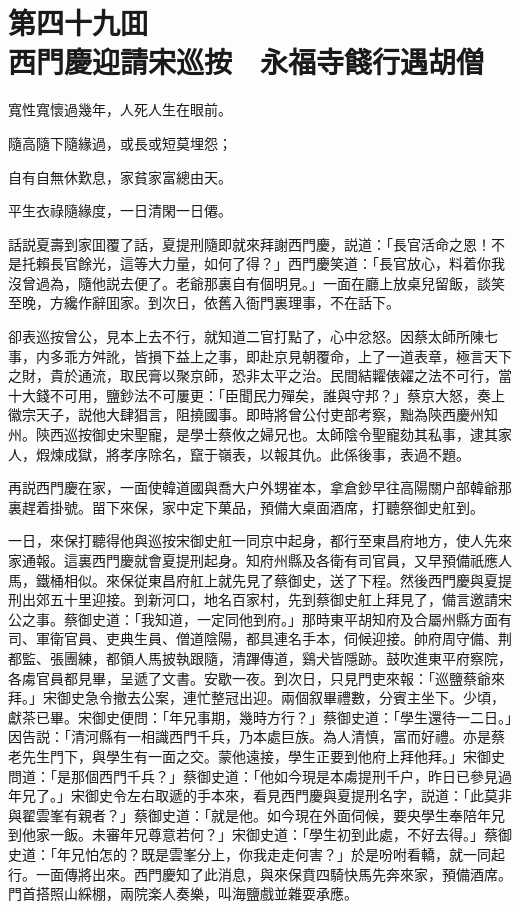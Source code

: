 
\chapter*{第四十九囬　\\西門慶迎請宋巡按　永福寺餞行遇胡僧}
\thispagestyle{empty}

\begin{myquote}
寬性寬懷過幾年，人死人生在眼前。

隨高隨下隨緣過，或長或短莫埋怨；

自有自無休歎息，家貧家富總由天。

平生衣祿隨緣度，一日清閑一日僊。
\end{myquote}

話説夏壽到家囬覆了話，夏提刑隨即就來拜謝西門慶，説道：「長官活命之恩！不是托賴長官餘光，這等大力量，如何了得？」西門慶笑道：「長官放心，料着你我沒曾過為，隨他説去便了。老爺那裏自有個明見。」一面在廳上放桌兒留飯，談笑至晚，方纔作辭囬家。到次日，依舊入衙門裏理事，不在話下。

卻表巡按曾公，見本上去不行，就知道二官打點了，心中忿怒。因蔡太師所陳七事，内多乖方舛訛，皆損下益上之事，即赴京見朝覆命，上了一道表章，極言天下之財，貴於通流，取民膏以聚京師，恐非太平之治。民間結糶俵糴之法不可行，當十大錢不可用，鹽鈔法不可屢更：「臣聞民力殫矣，誰與守邦？」蔡京大怒，奏上徽宗天子，説他大肆猖言，阻撓國事。即時將曾公付吏部考察，黜為陝西慶州知州。陝西巡按御史宋聖寵，是學士蔡攸之婦兄也。太師陰令聖寵劾其私事，逮其家人，煆煉成獄，將孝序除名，竄于嶺表，以報其仇。此係後事，表過不題。

再説西門慶在家，一面使韓道國與喬大户外甥崔本，拿倉鈔早往高陽關户部韓爺那裏趕着掛號。㽞下來保，家中定下菓品，預備大桌面酒席，打聽祭御史舡到。

一日，來保打聽得他與巡按宋御史舡一同京中起身，都行至東昌府地方，使人先來家通報。這裏西門慶就會夏提刑起身。知府州縣及各衛有司官員，又早預備祇應人馬，鐵桶相似。來保従東昌府舡上就先見了蔡御史，送了下程。然後西門慶與夏提刑出郊五十里迎接。到新河口，地名百家村，先到蔡御史舡上拜見了，備言邀請宋公之事。蔡御史道：「我知道，一定同他到府。」那時東平胡知府及合屬州縣方面有司、軍衛官員、吏典生員、僧道陰陽，都具連名手本，伺候迎接。帥府周守備、荆都監、張團練，都領人馬披執跟隨，清蹕傳道，鷄犬皆隱跡。鼓吹進東平府察院，各䖏官員都見畢，呈遞了文書。安歇一夜。到次日，只見門吏來報：「巡鹽蔡爺來拜。」宋御史急令撤去公案，連忙整冠出迎。兩個叙畢禮數，分賓主坐下。少頃，獻茶已畢。宋御史便問：「年兄事期，幾時方行？」蔡御史道：「學生還待一二日。」因告説：「清河縣有一相識西門千兵，乃本處巨族。為人清慎，富而好禮。亦是蔡老先生門下，與學生有一面之交。蒙他遠接，學生正要到他府上拜他拜。」宋御史問道：「是那個西門千兵？」蔡御史道：「他如今現是本䖏提刑千户，昨日已參見過年兄了。」宋御史令左右取遞的手本來，看見西門慶與夏提刑名字，説道：「此莫非與翟雲峯有親者？」蔡御史道：「就是他。如今現在外面伺候，要央學生奉陪年兄到他家一飯。未審年兄尊意若何？」宋御史道：「學生初到此處，不好去得。」蔡御史道：「年兄怕怎的？既是雲峯分上，你我走走何害？」於是吩咐看轎，就一同起行。一面傳將出來。西門慶知了此消息，與來保賁四騎快馬先奔來家，預備酒席。門首搭照山綵棚，兩院楽人奏樂，叫海鹽戲並雜耍承應。

